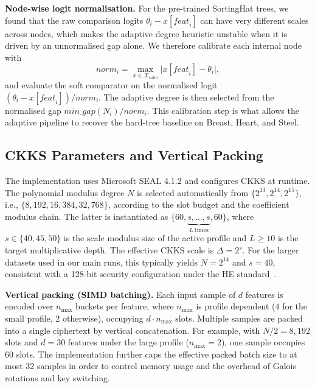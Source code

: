 \documentclass[runningheads]{llncs}
\begin{document}
\textbf{Node-wise logit normalisation.}  For the pre-trained SortingHat
trees, we found that the raw comparison logits $\theta_i - x[\mathit{feat}_i]$
can have very different scales across nodes, which makes the adaptive degree
heuristic unstable when it is driven by an unnormalised gap alone.  We
therefore calibrate each internal node with
\begin{equation}
  \mathit{norm}_i = \max_{x \in \mathcal{X}_{\mathrm{calib}}}
  \bigl|x[\mathit{feat}_i] - \theta_i\bigr|,
\end{equation}
and evaluate the soft comparator on the normalised logit
$(\theta_i - x[\mathit{feat}_i]) / \mathit{norm}_i$.  The adaptive degree is
then selected from the normalised gap
$\mathit{min\_gap}(N_i) / \mathit{norm}_i$.  This calibration step is what
allows the adaptive pipeline to recover the hard-tree baseline on Breast,
Heart, and Steel.

\subsection{CKKS Parameters and Vertical Packing}

The implementation uses Microsoft SEAL 4.1.2 and configures CKKS at runtime.
The polynomial modulus degree $N$ is selected automatically from
$\{2^{13}, 2^{14}, 2^{15}\}$, i.e., $\{8{,}192, 16{,}384, 32{,}768\}$,
according to the slot budget and the coefficient modulus chain.  The latter
is instantiated as $\{60, \underbrace{s,\ldots,s}_{L\ \mathrm{times}}, 60\}$,
where $s \in \{40,45,50\}$ is the scale modulus size of the active profile
and $L \geq 10$ is the target multiplicative depth.  The effective CKKS
scale is $\Delta = 2^s$.  For the larger datasets used in our main runs,
this typically yields $N = 2^{14}$ and $s = 40$, consistent with a 128-bit
security configuration under the HE standard~\cite{albrecht2021homomorphic}.

\textbf{Vertical packing (SIMD batching).}  Each input sample of $d$ features
is encoded over $n_{\max}$ buckets per feature, where $n_{\max}$ is profile
dependent ($4$ for the small profile, $2$ otherwise), occupying
$d \cdot n_{\max}$ slots.  Multiple samples are packed into a single
ciphertext by vertical concatenation.  For example, with $N/2 = 8{,}192$
slots and $d = 30$ features under the large profile ($n_{\max}=2$), one
sample occupies $60$ slots.  The implementation further caps the effective
packed batch size to at most 32 samples in order to control memory usage and
the overhead of Galois rotations and key switching.
\end{document}
